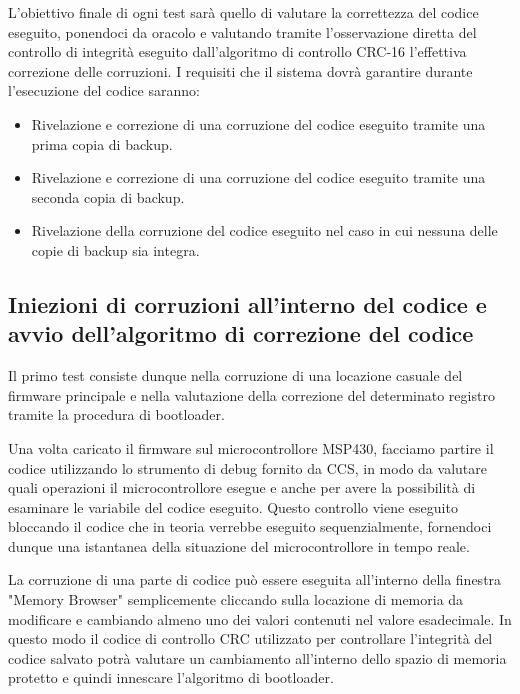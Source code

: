 \documentclass[LaM,binding=0.6cm]{../sapthesis}
\begin{document}
L'obiettivo finale di ogni test sarà quello di valutare la correttezza del codice eseguito, ponendoci da oracolo e valutando tramite l'osservazione diretta del controllo di integrità eseguito dall'algoritmo di controllo CRC-16 l'effettiva correzione delle corruzioni.\newline\newline
I requisiti che il sistema dovrà garantire durante l'esecuzione del codice saranno:
\begin{itemize}
    \item  Rivelazione e correzione di una corruzione del codice eseguito tramite una prima copia di backup.
    
    \item  Rivelazione e correzione di una corruzione del codice eseguito tramite una seconda copia di backup.
    
    \item  Rivelazione della corruzione del codice eseguito nel caso in cui nessuna delle copie di backup sia integra.
        
\end{itemize}


\subsection{Iniezioni di corruzioni all'interno del codice e avvio dell'algoritmo di correzione del codice}

Il primo test consiste dunque nella corruzione di una locazione casuale del firmware principale e nella valutazione della correzione del determinato registro tramite la procedura di bootloader.

Una volta caricato il firmware sul microcontrollore MSP430, facciamo partire il codice utilizzando lo strumento di debug fornito da CCS, in modo da valutare quali operazioni il microcontrollore esegue e anche per avere la possibilità di esaminare le variabile del codice eseguito. Questo controllo viene eseguito bloccando il codice che in teoria verrebbe eseguito sequenzialmente, fornendoci dunque una istantanea della situazione del microcontrollore in tempo reale.

La corruzione di una parte di codice può essere eseguita all'interno della finestra "Memory Browser" semplicemente cliccando sulla locazione di memoria da modificare e cambiando almeno uno dei valori contenuti nel valore esadecimale.
In questo modo il codice di controllo CRC utilizzato per controllare l'integrità del codice salvato potrà valutare un cambiamento all'interno dello spazio di memoria protetto e quindi innescare l'algoritmo di bootloader.
\end{document}
